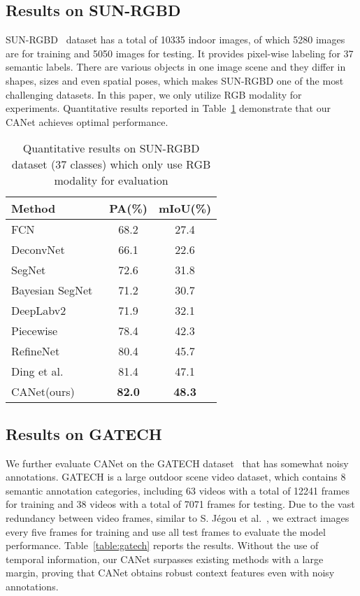 \documentclass[journal]{IEEEtran}
\begin{document}
\subsection{Results on SUN-RGBD}
SUN-RGBD~\cite{song2015sun} dataset has a total of 10335 indoor images, of which 5280 images are for training and 5050 images for testing. It provides pixel-wise labeling for 37 semantic labels. There are various objects in one image scene and they differ in shapes, sizes and even spatial poses, which makes SUN-RGBD one of the most challenging datasets. In this paper, we only utilize RGB modality for experiments. Quantitative results reported in Table~\ref{table:sunrgbd} demonstrate that our CANet achieves optimal performance.

\begin{table}
\caption{Quantitative results on SUN-RGBD dataset (37 classes) which only use RGB modality for evaluation}
\begin{center}
    \begin{tabular}{l|cc}
    \toprule
        \textbf{Method} & \textbf{PA(\%)} & \textbf{mIoU(\%)} \\
    \midrule\midrule
        FCN~\cite{long2015fully} & 68.2 & 27.4 \\
        DeconvNet~\cite{noh2015learning} & 66.1 & 22.6 \\
        SegNet~\cite{badrinarayanan2017segnet} & 72.6 & 31.8 \\
        Bayesian SegNet~\cite{kendall2015bayesian} & 71.2 & 30.7 \\
        DeepLabv2~\cite{chen2017deeplab} & 71.9 & 32.1 \\
        Piecewise~\cite{lin2016efficient} & 78.4 & 42.3 \\
        RefineNet~\cite{lin2017refinenet} & 80.4 & 45.7 \\
        Ding et al.~\cite{ding2018context} & 81.4 & 47.1 \\
    \midrule
        CANet(ours) & \textbf{82.0} & \textbf{48.3} \\
    \bottomrule
    \end{tabular}
\end{center}
\label{table:sunrgbd}
\end{table}

\subsection{Results on GATECH}
We further evaluate CANet on the GATECH dataset~\cite{hussain2013geometric} that has somewhat noisy annotations. GATECH is a large outdoor scene video dataset, which contains 8 semantic annotation categories, including 63 videos with a total of 12241 frames for training and 38 videos with a total of 7071 frames for testing. Due to the vast redundancy between video frames, similar to S. J{\'e}gou et al.~\cite{jegou2017one}, we extract images every five frames for training and use all test frames to evaluate the model performance. Table~\ref{table:gatech} reports the results. Without the use of temporal information, our CANet surpasses existing methods with a large margin, proving that CANet obtains robust context features even with noisy annotations.
\end{document}
